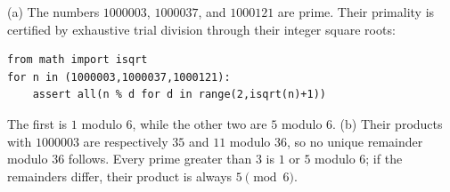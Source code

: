 (a) The numbers $1000003$, $1000037$, and $1000121$ are prime. Their primality is certified by exhaustive trial division through their integer square roots:
\begin{verbatim}
from math import isqrt
for n in (1000003,1000037,1000121):
    assert all(n % d for d in range(2,isqrt(n)+1))
\end{verbatim}
The first is $1$ modulo $6$, while the other two are $5$ modulo $6$. (b) Their products with $1000003$ are respectively $35$ and $11$ modulo $36$, so no unique remainder modulo $36$ follows. Every prime greater than $3$ is $1$ or $5$ modulo $6$; if the remainders differ, their product is always $\boxed5\pmod6$.
